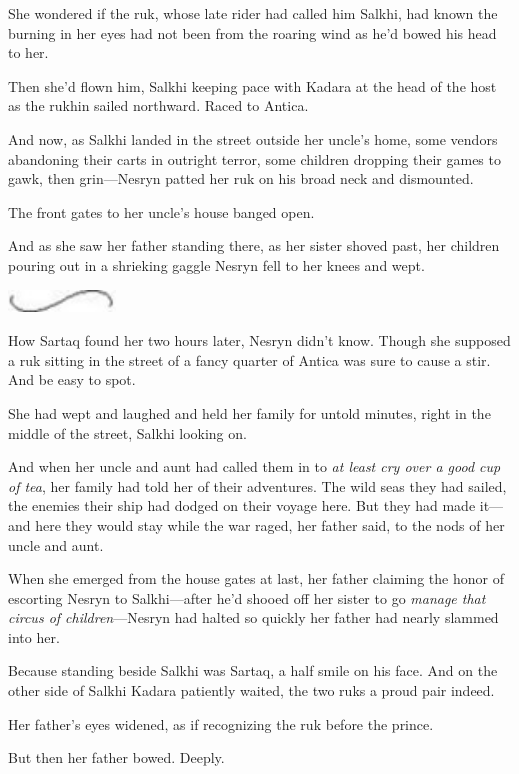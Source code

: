 She wondered if the ruk, whose late rider had called him Salkhi, had known the burning in her eyes had not been from the roaring wind as he'd bowed his head to her.

Then she'd flown him, Salkhi keeping pace with Kadara at the head of the host as the rukhin sailed northward. Raced to Antica.

And now, as Salkhi landed in the street outside her uncle's home, some vendors abandoning their carts in outright terror, some children dropping their games to gawk, then grin---Nesryn patted her ruk on his broad neck and dismounted.

The front gates to her uncle's house banged open.

And as she saw her father standing there, as her sister shoved past, her children pouring out in a shrieking gaggle  Nesryn fell to her knees and wept.

\includegraphics[width=1.12in,height=0.24in]{images/seperator}

How Sartaq found her two hours later, Nesryn didn't know. Though she supposed a ruk sitting in the street of a fancy quarter of Antica was sure to cause a stir. And be easy to spot.

She had wept and laughed and held her family for untold minutes, right in the middle of the street, Salkhi looking on.

And when her uncle and aunt had called them in to \emph{at least cry over a good cup of tea}, her family had told her of their adventures. The wild seas they had sailed, the enemies their ship had dodged on their voyage here. But they had made it---and here they would stay while the war raged, her father said, to the nods of her uncle and aunt.

When she emerged from the house gates at last, her father claiming the honor of escorting Nesryn to Salkhi---after he'd shooed off her sister to go \emph{manage that circus of children}---Nesryn had halted so quickly her father had nearly slammed into her.

Because standing beside Salkhi was Sartaq, a half smile on his face. And on the other side of Salkhi  Kadara patiently waited, the two ruks a proud pair indeed.

Her father's eyes widened, as if recognizing the ruk before the prince.

But then her father bowed. Deeply.

